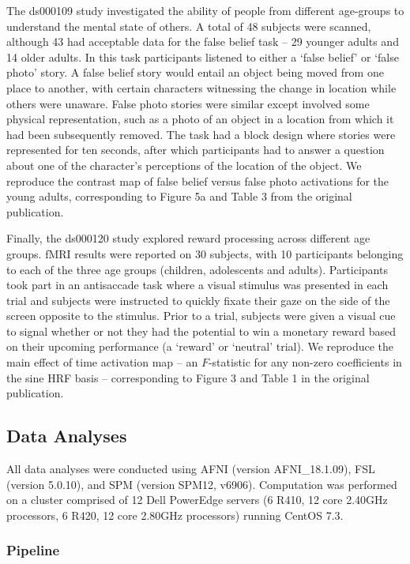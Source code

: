 The ds000109 study investigated the ability of people from different age-groups to understand the mental state of others. A total of 48 subjects were scanned, although 43 had acceptable data for the false belief task -- 29 younger adults and 14 older adults. In this task participants listened to either a `false belief' or `false photo' story. A false belief story would entail an object being moved from one place to another, with certain characters witnessing the change in location while others were unaware. False photo stories were similar except involved some physical representation, such as a photo of an object in a location from which it had been subsequently removed. The task had a block design where stories were represented for ten seconds, after which participants had to answer a question about one of the character's perceptions of the location of the object. We reproduce the contrast map of false belief versus false photo activations for the young adults, corresponding to Figure 5a and Table 3 from the original publication.

Finally, the ds000120 study explored reward processing across different age groups. fMRI results were reported on 30 subjects, with 10 participants belonging to each of the three age groups (children, adolescents and adults). Participants took part in an antisaccade task where a visual stimulus was presented in each trial and subjects were instructed to quickly fixate their gaze on the side of the screen opposite to the stimulus. Prior to a trial, subjects were given a visual cue to signal whether or not they had the potential to win a monetary reward based on their upcoming performance (a `reward' or `neutral' trial). We reproduce the main effect of time activation map -- an $F$-statistic for any non-zero coefficients in the sine HRF basis -- corresponding to Figure 3 and Table 1 in the original publication.  

\subsection{Data Analyses}

All data analyses were conducted using AFNI (version AFNI\_18.1.09), FSL (version 5.0.10), and SPM (version SPM12, v6906). Computation was performed on a cluster comprised of 12 Dell PowerEdge servers (6 R410, 12 core 2.40GHz processors, 6 R420, 12 core 2.80GHz processors) running CentOS 7.3.

\subsubsection{Pipeline}

